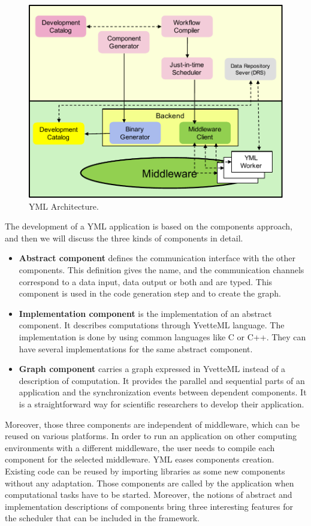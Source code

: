 \begin{figure}[htbp]
	\centering
	\includegraphics[width=.92\linewidth]{fig/yml-arch.pdf}
	\caption{YML Architecture.}
	\label{yml-arch}
\end{figure}

The development of a YML application is based on the components approach, and then we will discuss the three kinds of components in detail.

\begin{itemize}
	\item \textbf{Abstract component} defines the communication interface with the other components. This definition gives the name, and the communication channels correspond to a data input, data output or both and are typed. This component is used in the code generation step and to create the graph.
	
	\item \textbf{Implementation component} is the implementation of an abstract component. It describes computations through YvetteML language. The implementation is done by using common languages like C or C++. They can have several implementations for the same abstract component.
	
	\item \textbf{Graph component} carries a graph expressed in YvetteML instead of a description of computation. It provides the parallel and sequential parts of an application and the synchronization events between dependent components. It is a straightforward way for scientific researchers to develop their application.
\end{itemize}

Moreover, those three components are independent of middleware, which can be reused on various platforms. In order to run an application on other computing environments with a different middleware, the user needs to compile each component for the selected middleware.  YML eases components creation. Existing code can be reused by importing libraries as some new components without any adaptation. Those components are called by the application when computational tasks have to be started. Moreover, the notions of abstract and implementation descriptions of components bring three interesting features for the scheduler that can be included in the framework.


